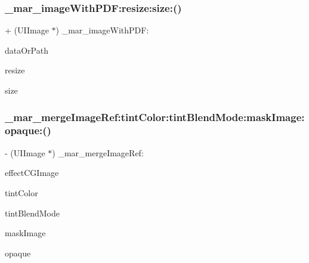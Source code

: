 \subsubsection{\texorpdfstring{\+\_\+mar\+\_\+image\+With\+P\+D\+F\+:resize\+:size\+:()}{\_mar\_imageWithPDF:resize:size:()}}
{\footnotesize\ttfamily + (U\+I\+Image $\ast$) \+\_\+mar\+\_\+image\+With\+P\+D\+F\+: \begin{DoxyParamCaption}\item[{(id)}]{data\+Or\+Path }\item[{resize:(B\+O\+OL)}]{resize }\item[{size:(C\+G\+Size)}]{size }\end{DoxyParamCaption}\hspace{0.3cm}{\ttfamily [implementation]}}

\mbox{\label{category_u_i_image_07_m_a_r_e_x_08_a81016c59ca04f115e8a81953b5cad818}} 
\subsubsection{\texorpdfstring{\+\_\+mar\+\_\+merge\+Image\+Ref\+:tint\+Color\+:tint\+Blend\+Mode\+:mask\+Image\+:opaque\+:()}{\_mar\_mergeImageRef:tintColor:tintBlendMode:maskImage:opaque:()}}
{\footnotesize\ttfamily -\/ (U\+I\+Image $\ast$) \+\_\+mar\+\_\+merge\+Image\+Ref\+: \begin{DoxyParamCaption}\item[{(C\+G\+Image\+Ref)}]{effect\+C\+G\+Image }\item[{tintColor:(U\+I\+Color $\ast$)}]{tint\+Color }\item[{tintBlendMode:(C\+G\+Blend\+Mode)}]{tint\+Blend\+Mode }\item[{maskImage:(U\+I\+Image $\ast$)}]{mask\+Image }\item[{opaque:(B\+O\+OL)}]{opaque }\end{DoxyParamCaption}\hspace{0.3cm}{\ttfamily [implementation]}}

